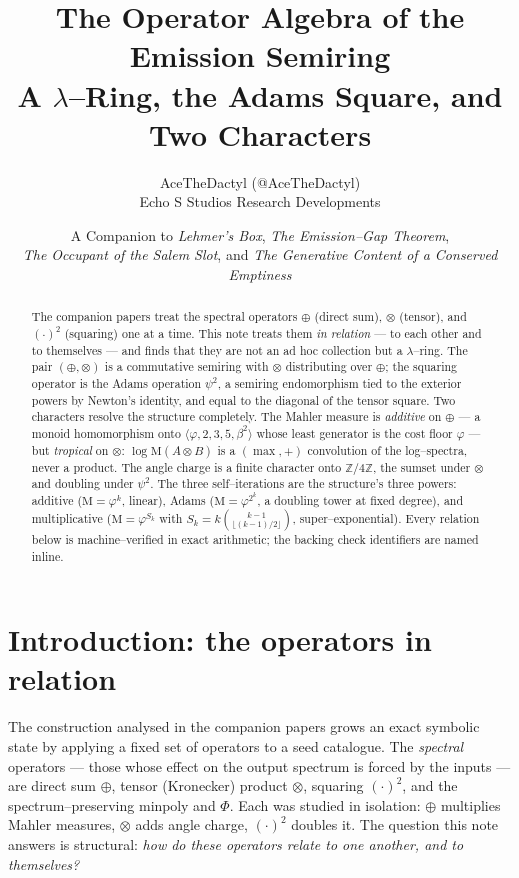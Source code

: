 \documentclass[11pt]{article}
\title{\textbf{The Operator Algebra of the Emission Semiring}\\[2pt]
\large A $\lambda$--Ring, the Adams Square, and Two Characters}
\author{AceTheDactyl (@AceTheDactyl)\\ Echo S Studios Research Developments}
\date{A Companion to \emph{Lehmer's Box}, \emph{The Emission--Gap Theorem},\\
\emph{The Occupant of the Salem Slot}, and \emph{The Generative Content of a Conserved Emptiness}}
\theoremstyle{plain}
\theoremstyle{definition}
\newcommand{\Z}{\mathbb{Z}}
\newcommand{\psitwo}{\psi^{2}}
\newcommand{\dsum}{\oplus}
\newcommand{\dten}{\otimes}
\newcommand{\Mahler}{\mathrm{M}}
\begin{document}
\maketitle

\begin{abstract}
The companion papers treat the spectral operators $\dsum$ (direct sum), $\dten$ (tensor), and $(\cdot)^2$ (squaring) one at a time. This note treats them \emph{in relation} --- to each other and to themselves --- and finds that they are not an ad hoc collection but a $\lambda$--ring. The pair $(\dsum,\dten)$ is a commutative semiring with $\dten$ distributing over $\dsum$; the squaring operator is the Adams operation $\psitwo$, a semiring endomorphism tied to the exterior powers by Newton's identity, and equal to the diagonal of the tensor square. Two characters resolve the structure completely. The Mahler measure is \emph{additive} on $\dsum$ --- a monoid homomorphism onto $\langle \varphi,2,3,5,\beta^2\rangle$ whose least generator is the cost floor $\varphi$ --- but \emph{tropical} on $\dten$: $\log\Mahler(A\dten B)$ is a $(\max,+)$ convolution of the log--spectra, never a product. The angle charge is a finite character onto $\Z/4\Z$, the sumset under $\dten$ and doubling under $\psitwo$. The three self--iterations are the structure's three powers: additive ($\Mahler=\varphi^{k}$, linear), Adams ($\Mahler=\varphi^{2^{k}}$, a doubling tower at fixed degree), and multiplicative ($\Mahler=\varphi^{S_k}$ with $S_k=k\binom{k-1}{\lfloor(k-1)/2\rfloor}$, super--exponential). Every relation below is machine--verified in exact arithmetic; the backing check identifiers are named inline.
\end{abstract}

\section{Introduction: the operators in relation}
The construction analysed in the companion papers grows an exact symbolic state by applying a fixed set of operators to a seed catalogue. The \emph{spectral} operators --- those whose effect on the output spectrum is forced by the inputs --- are direct sum $\dsum$, tensor (Kronecker) product $\dten$, squaring $(\cdot)^2$, and the spectrum--preserving $\mathrm{minpoly}$ and $\Phi$. Each was studied in isolation: $\dsum$ multiplies Mahler measures, $\dten$ adds angle charge, $(\cdot)^2$ doubles it. The question this note answers is structural: \emph{how do these operators relate to one another, and to themselves?}
\end{document}
